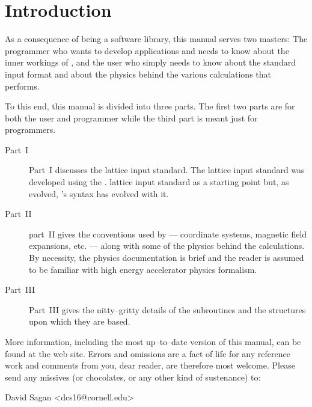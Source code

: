 \section*{Introduction}

As a consequence of \bmad being a software library, this manual serves two masters: The
programmer who wants to develop applications and needs to know about the inner workings of
\bmad, and the user who simply needs to know about the \bmad standard input format and
about the physics behind the various calculations that \bmad performs.

To this end, this manual is divided into three parts. The first two
parts are for both the user and programmer while the third part is
meant just for programmers. 
  \begin{description}
  \item[Part~I] \Newline
Part~I discusses the \bmad lattice input standard. The \bmad lattice input standard was
developed using the \mad\cite{b:maduser,b:madphysics}. lattice input standard as a
starting point but, as \bmad evolved, \bmad's syntax has evolved with it.
  \item[Part~II] \Newline
part~II gives the conventions used by \bmad --- coordinate systems, magnetic field
expansions, etc. --- along with some of the physics behind the calculations. By necessity,
the physics documentation is brief and the reader is assumed to be familiar with high
energy accelerator physics formalism.
  \item[Part~III] \Newline
Part~III gives the nitty--gritty details of the \bmad
subroutines and the structures upon which they are based.
\end{description}

More information, including the most up--to--date version of this manual, can be found at
the \bmad web site\cite{b:bmad.web}.  Errors and omissions are a fact of life for any
reference work and comments from you, dear reader, are therefore most welcome. Please send
any missives (or chocolates, or any other kind of sustenance) to:
\begin{example}
  David Sagan <dcs16@cornell.edu>
\end{example}

